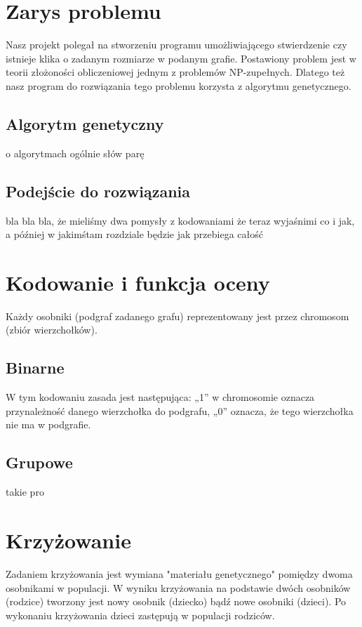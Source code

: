 \documentclass[11pt]{aghdpl}
\author{Wojciech Kasperek, Krzysztof Spytkowski, Izabela Śmietana}
\date{2014}
\begin{document}
\titlepages

\tableofcontents
\clearpage

\chapter{Zarys problemu}
\label{cha:wprowadzenie}
Nasz projekt polegał na stworzeniu programu umożliwiającego stwierdzenie czy istnieje klika o zadanym rozmiarze w podanym grafie. Postawiony problem jest w teorii złożoności obliczeniowej jednym z problemów NP-zupełnych. Dlatego też nasz program do rozwiązania tego problemu korzysta z algorytmu genetycznego. 
\section{Algorytm genetyczny}
\label{sec:algGenetyczne}
o algorytmach ogólnie słów parę
\section{Podejście do rozwiązania}
\label{sec:podejscie}
bla bla bla, że mieliśmy dwa pomysły z kodowaniami
że teraz wyjaśnimi co i jak, a później w jakimśtam rozdziale będzie jak przebiega całość

\chapter{Kodowanie i funkcja oceny}
\label{cha:encoding}
Każdy osobniki (podgraf zadanego grafu) reprezentowany jest przez chromosom (zbiór wierzchołków). 
\section{Binarne}
\label{sec:binary}
W tym kodowaniu zasada jest następująca: „1” w chromosomie oznacza przynależność danego wierzchołka do podgrafu, „0” oznacza, że tego wierzchołka nie ma w podgrafie.
\section{Grupowe}
\label{sec:group}
takie pro

\chapter{Krzyżowanie}
\label{cha:crossing}
Zadaniem krzyżowania jest wymiana "materiału genetycznego" pomiędzy dwoma osobnikami w populacji. W wyniku krzyżowania na podstawie dwóch osobników (rodzice) tworzony jest nowy osobnik (dziecko) bądź nowe osobniki (dzieci). Po wykonaniu krzyżowania dzieci zastępują w populacji rodziców. 
 
\end{document}
